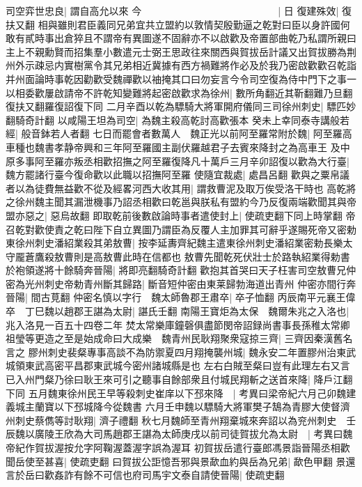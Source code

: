 司空弈世忠良|{
	謂自高允以來}
今　　　　　　　　　　　　　　|{
	日}
復建殊效|{
	復扶又翻}
相與雖則君臣義同兄弟宜共立盟約以敦情契殷勤逼之乾對曰臣以身許國何敢有貳時事出倉猝且不謂帝有異圖遂不固辭亦不以啟歡及帝置部曲乾乃私謂所親曰主上不親勳賢而招集羣小數遣元士弼王思政往來關西與賀拔岳計議又出賀拔勝為荆州外示疎忌内實樹黨令其兄弟相近冀據有西方禍難將作必及於我乃密啟歡歡召乾詣并州面論時事乾因勸歡受魏禪歡以䄂掩其口曰勿妄言今令司空復為侍中門下之事一以相委歡屢啟請帝不許乾知變難將起密啟歡求為徐州|{
	數所角翻近其靳翻難乃旦翻復扶又翻羅復詔復下同}
二月辛酉以乾為驃騎大將軍開府儀同三司徐州刺史|{
	驃匹妙翻騎奇計翻}
以咸陽王坦為司空|{
	為魏主殺高乾討高歡張本}
癸未上幸同泰寺講般若經|{
	般音鉢若人者翻}
七日而罷會者數萬人　魏正光以前阿至羅常附於魏|{
	阿至羅高車種也魏書孝静帝興和三年阿至羅國主副伏羅越君子去賓來降封之為高車王}
及中原多事阿至羅亦叛丞相歡招撫之阿至羅復降凡十萬戶三月辛卯詔復以歡為大行臺|{
	魏方罷諸行臺今復命歡以此職以招撫阿至羅}
使隨宜裁處|{
	處昌呂翻}
歡與之粟帛議者以為徒費無益歡不從及經畧河西大收其用|{
	謂救曹泥及取万俟受洛干時也}
高乾將之徐州魏主聞其漏泄機事乃詔丞相歡曰乾邕與朕私有盟約今乃反復兩端歡聞其與帝盟亦惡之|{
	惡烏故翻}
即取乾前後數啟論時事者遣使封上|{
	使疏吏翻下同上時掌翻}
帝召乾對歡使責之乾曰陛下自立異圖乃謂臣為反覆人主加罪其可辭乎遂賜死帝又密勅東徐州刺史潘紹業殺其弟敖曹|{
	按李延夀齊紀魏主遣東徐州刺史潘紹業密勅長樂太守龎蒼鷹殺敖曹則是高敖曹此時在信都也}
敖曹先聞乾死伏壯士於路執紹業得勅書於袍領遂將十餘騎奔晉陽|{
	將即亮翻騎奇計翻}
歡抱其首哭曰天子枉害司空敖曹兄仲密為光州刺史帝勅青州斷其歸路|{
	斷音短仲密由東莱歸勃海道出青州}
仲密亦間行奔晉陽|{
	間古莧翻}
仲密名慎以字行　魏太師魯郡王肅卒|{
	卒子恤翻}
丙辰南平元襄王偉卒　丁巳魏以趙郡王諶為太尉|{
	諶氏壬翻}
南陽王寶炬為太保　魏爾朱兆之入洛也|{
	兆入洛見一百五十四卷二年}
焚太常樂庫鐘磬俱盡節閔帝詔録尚書事長孫稚太常卿祖瑩等更造之至是始成命曰大成樂　魏青州民耿翔聚衆寇掠三齊|{
	三齊因秦漢舊名言之}
膠州刺史裴粲專事高談不為防禦夏四月翔掩襲州城|{
	魏永安二年置膠州治東武城領東武高密平昌郡東武城今密州諸城縣是也}
左右白賊至粲曰豈有此理左右又言已入州門粲乃徐曰耿王來可引之聽事自餘部衆且付城民翔斬之送首來降|{
	降戶江翻下同}
五月魏東徐州民王早等殺刺史崔庠以下邳來降　|{
	考異曰梁帝紀六月己卯魏建義城主蘭寶以下邳城降今從魏書}
六月壬申魏以驃騎大將軍樊子鵠為青膠大使督濟州刺史蔡儁等討耿翔|{
	濟子禮翻}
秋七月魏師至青州翔棄城來奔詔以為兖州刺史　壬辰魏以廣陵王欣為大司馬趙郡王諶為太師庚戌以前司徒賀拔允為太尉　|{
	考異曰魏帝紀作賀拔渥按允字阿鞠渥蓋渥字誤為渥耳}
初賀拔岳遣行臺郎馮景詣晉陽丞相歡聞岳使至甚喜|{
	使疏吏翻}
曰賀拔公詎憶吾邪與景歃血約與岳為兄弟|{
	歃色甲翻}
景還言於岳曰歡姦詐有餘不可信也府司馬宇文泰自請使晉陽|{
	使疏吏翻}
